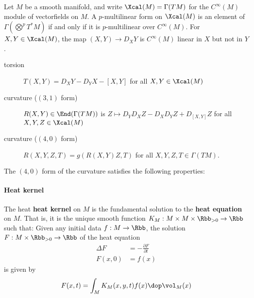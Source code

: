 Let $M$ be a smooth manifold, and write $\Xcal(M) = \Gamma(TM)$ for the $C^\infty(M)$ module of vectorfields on $M$. A $p$-multilinear form on $\Xcal(M)$ is an element of $\Gamma(\bigotimes^p T^*M)$ if and only if it is $p$-multilinear over $C^\infty(M)$. For $X,Y\in \Xcal(M)$, the map $(X,Y) \to D_X Y$ is $C^\infty(M)$ linear in $X$ but not in $Y$.

\begin{description}
  \item[torsion] $T(X,Y) = D_X Y - D_Y X - [X,Y]$ for all $X,Y \in \Xcal(M)$
  \item[curvature ($(3,1)$ form)] $R(X,Y) \in \End(\Gamma(TM))$ is $Z \mapsto  D_Y D_X Z - D_X D_Y Z + D_{[X,Y]}Z$ for all $X,Y,Z \in \Xcal(M)$
  \item[curvature ($(4,0)$ form)] $R(X,Y,Z,T) = g(R(X,Y)Z,T)$ for all $X,Y,Z,T \in \Gamma(TM)$.
\end{description}
The $(4,0)$ form of the curvature satisfies the following properties:

\paragraph{Heat kernel}
The heat \textbf{heat kernel} on $M$ is the fundamental solution to the \textbf{heat equation} on $M$. That is,  it is the unique smooth function $K_M:M\times M \times \Rbb_{>0} \to \Rbb$ such that:  Given any initial data $f: M \to \Rbb$, the solution $F:M\times \Rbb_{>0} \to \Rbb$ of the heat equation
\begin{align}
  \Delta F & = - \frac{\partial F}{\partial t} \\
  F(x,0)   & = f(x)
\end{align}
is given by
\begin{align}
  F(x,t) = \int_M K_M(x,y,t)f(x) \dop \vol_M(x)
\end{align}


